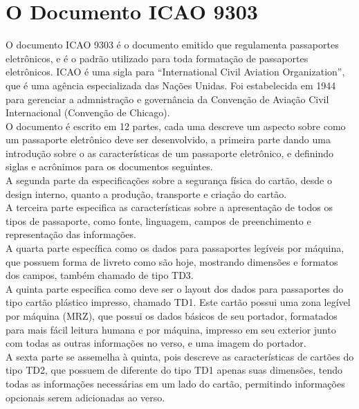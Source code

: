 \documentclass{article}
\begin{document}
	\section{O Documento ICAO 9303\cite{ICAO}}
		\begin{justify}
			
				\hspace*{2cm} O documento ICAO 9303 é o documento emitido que regulamenta passaportes eletrônicos, e é o padrão utilizado para toda formatação de passaportes eletrônicos. ICAO é uma sigla para “International Civil Aviation Organization”, que é uma agência especializada das Nações Unidas. Foi estabelecida em 1944 para gerenciar a admnistração e governância da Convenção de Aviação Civil Internacional (Convenção de Chicago). \\
    			\hspace*{2cm} O documento é escrito em 12 partes, cada uma descreve um aspecto sobre como um passaporte eletrônico deve ser desenvolvido, a primeira parte dando uma introdução sobre o as características de um passaporte eletrônico, e definindo siglas e acrônimos para os documentos seguintes.\\
    			\hspace*{2cm} A segunda parte da especificações sobre a segurança física do cartão, desde o design interno, quanto a produção, transporte e criação do cartão. \\
				\hspace*{2cm} A terceira parte especifica as características sobre a apresentação de todos os tipos de passaporte, como fonte, linguagem, campos de preenchimento e representação das informações. \\
				\hspace*{2cm} A quarta parte específica como os dados para passaportes legíveis por máquina, que possuem forma de livreto como são hoje, mostrando dimensões e formatos dos campos, também chamado de tipo TD3. \\
				\hspace*{2cm} A quinta parte especifica como deve ser o layout dos dados para passaportes do tipo cartão plástico impresso, chamado TD1. Este cartão possui uma zona legível por máquina (MRZ), que possui os dados básicos de seu portador, formatados para mais fácil leitura humana e por máquina, impresso em seu exterior junto com todas as outras informações no verso, e uma imagem do portador.\\
				\hspace*{2cm} A sexta parte se assemelha à quinta, pois descreve as características de cartões do tipo TD2, que possuem de diferente do tipo TD1 apenas suas dimensões, tendo todas as informações necessárias em um lado do cartão, permitindo informações opcionais serem adicionadas ao verso.\\

\end{justify}
\end{document}

